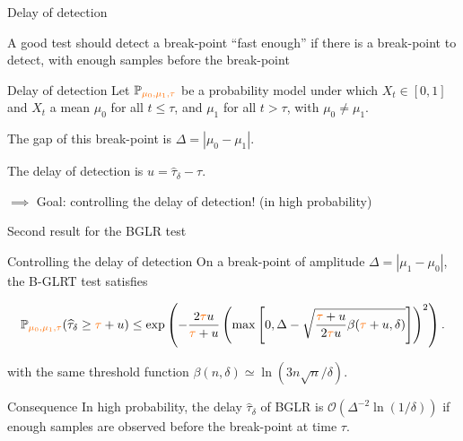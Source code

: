 \documentclass[11pt,english,ignorenonframetext,]{beamer}
\begin{document}
\begin{frame}{Delay of detection}

  A good test should detect a break-point ``fast enough'' if there is a break-point to detect, with enough samples before the break-point

  \begin{block}{Delay of detection}
    Let $\mathbb{P}_{\textcolor{meca}{\mu_0,\mu_1,\tau}}$ be a probability model under which $X_t \in[0,1]$ and \textcolor{meca}{$X_t$ a mean $\mu_0$ for all $t \leq \tau$, and $\mu_1$ for all $t > \tau$,
    with $\mu_0 \neq \mu_1$}.

    The \alert{gap} of this break-point is $\Delta = |\mu_0 - \mu_1|$.

    The \alert{delay of detection} is $u = \widehat{\tau}_{\delta} - \tau$.
  \end{block}

  \alert{$\implies$ Goal: controlling the delay of detection!} (in high probability)

\end{frame}

\begin{frame}{Second result for the BGLR test}

  \begin{block}{Controlling the delay of detection}
      On a break-point of amplitude $\Delta = |\mu_1 - \mu_0|$,
      the B-GLRT test satisfies
      \begin{small}
      \[ \mathbb{P}_{\textcolor{meca}{\mu_0,\mu_1,\tau}} (\widehat{\tau}_{\delta} \geq \textcolor{meca}{\tau} + u) \leq \exp\left( -\frac{2\textcolor{meca}{\tau} u}{\textcolor{meca}{\tau} + u}\left(\max\left[ 0, \Delta - \sqrt{\frac{\textcolor{meca}{\tau} + u}{2\textcolor{meca}{\tau} u} \beta(\textcolor{meca}{\tau} + u,\delta)} \right]\right)^2 \right). \]
      \end{small}
      with the same threshold function
      $\beta(n,\delta) \simeq \ln(3n \sqrt{n}/\delta)$.
  \end{block}

  \begin{exampleblock}{Consequence}
    In high probability, the delay $\widehat{\tau}_\delta$ of BGLR is $\mathcal{O}(\Delta^{-2} \ln(1/\delta))$ if enough samples are observed before the break-point at time $\tau$.
  \end{exampleblock}

\end{frame}
\end{document}
